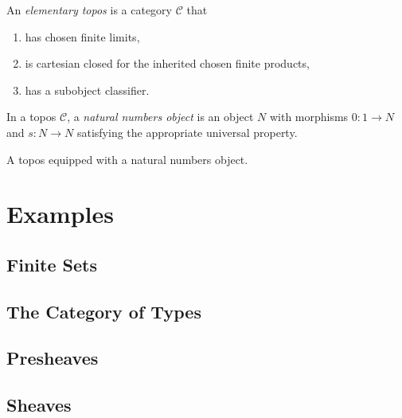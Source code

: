 \begin{definition}
\label{def:elementary_topos}
\notready
An \emph{elementary topos} is a category $\mathcal{C}$ that
\begin{enumerate}
\item has chosen finite limits,
\item is cartesian closed for the inherited chosen finite products,
\item has a subobject classifier.
\end{enumerate}
\end{definition}

\begin{definition}
\label{def:nno}
\notready
In a topos $\mathcal{C}$, a \emph{natural numbers object} is an object $N$ with morphisms $0 : 1 \to N$ and $s : N \to N$ satisfying the appropriate universal property.
\end{definition}

\begin{definition}
\label{def:topos_with_nno}
\notready
A topos equipped with a natural numbers object.
\end{definition}

\section{Examples}
\subsection{Finite Sets}
\subsection{The Category of Types}
\subsection{Presheaves}
\subsection{Sheaves}


